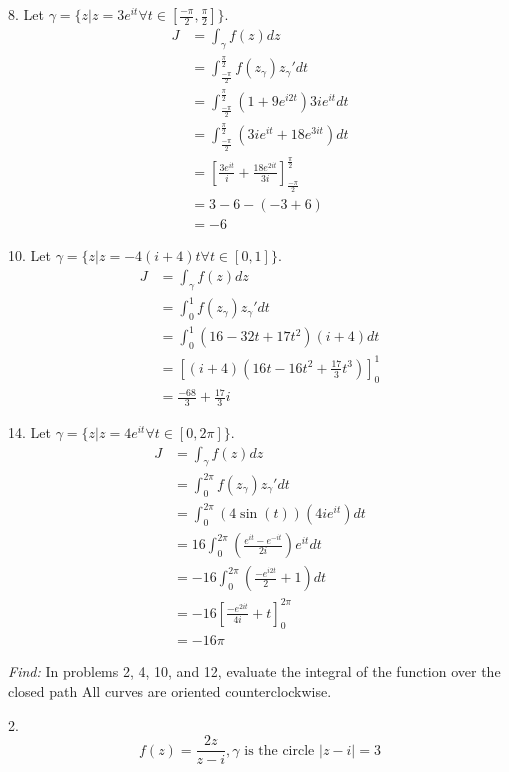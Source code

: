 \documentclass[11pt]{homework}
\begin{document}
8.  Let $\gamma = \{z | z = 3 e^{it} \forall t\in[\frac{-\pi}{2},\frac{\pi}{2}]\}$.
\begin{align*}
  J &= \int_\gamma f(z) dz \\
    &= \int_\frac{-\pi}{2}^{\frac{\pi}{2}} f(z_\gamma) z_\gamma' dt  \\
    &= \int_\frac{-\pi}{2}^{\frac{\pi}{2}} (1+9e^{i2t}) 3ie^{it} dt  \\
    &= \int_\frac{-\pi}{2}^{\frac{\pi}{2}} ( 3ie^{it} + 18 e^{3it}) dt   \\
    &= \left[ \frac{3e^{it}}{i} + \frac{18e^{2it}}{3i} \right]_\frac{-\pi}{2}^\frac{\pi}{2}  \\
    &= 3 - 6 - (-3+6) \\
    &= -6
\end{align*}

10. Let $\gamma = \{z | z = -4 (i+4)t \forall t\in[0,1]\}$.
\begin{align*}
  J &= \int_\gamma f(z) dz \\
    &= \int_0^1 f(z_\gamma) z_\gamma' dt  \\
    &= \int_0^1 (16-32t+17t^2)(i+4) dt  \\
    &= \left[ (i+4)(16t - 16t^2+\frac{17}{3}t^3)\right]_0^1 \\
    &= \frac{-68}{3} + \frac{17}{3}i
\end{align*}

14. Let $\gamma = \{z | z = 4 e^{it} \forall t\in[0,2\pi]\}$.
\begin{align*}
  J &= \int_\gamma f(z) dz \\
    &= \int_0^{2\pi} f(z_\gamma) z_\gamma' dt  \\
    &= \int_0^{2\pi} (4\sin(t)) (4ie^{it}) dt \\
    &= 16 \int_0^{2\pi} \left(\frac{e^{it} - e^{-it}}{2i}\right) e^{it} dt  \\
    &= -16 \int_0^{2\pi} (\frac{-e^{i2t}}{2} +1) dt  \\
    &= -16 \left[ \frac{-e^{2it}}{4i} +t \right]_0^{2\pi} \\
    &= -16 \pi
\end{align*}

\newpage
{}
\emph{Find:}
\newline
In problems 2, 4, 10, and 12, 
evaluate the integral of the function over the closed path
All curves are oriented counterclockwise.

2.
\begin{equation*}
  f(z) = \frac{2z}{z-i}, \gamma \text{ is the circle } |z-i|=3
\end{equation*} 
\end{document}
